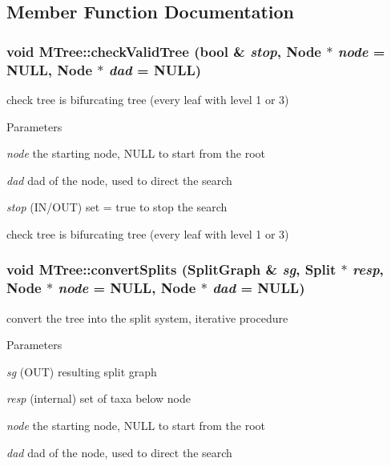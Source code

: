 \subsection{Member Function Documentation}
\hypertarget{classMTree_a4ba0e04e2f9a71b98eb2c640a1931fa7}{
\subsubsection[{checkValidTree}]{\setlength{\rightskip}{0pt plus 5cm}void MTree::checkValidTree (bool \& {\em stop}, \/  {\bf Node} $\ast$ {\em node} = {\ttfamily NULL}, \/  {\bf Node} $\ast$ {\em dad} = {\ttfamily NULL})}}
\label{classMTree_a4ba0e04e2f9a71b98eb2c640a1931fa7}
check tree is bifurcating tree (every leaf with level 1 or 3) 
\begin{DoxyParams}{Parameters}
\item[{\em node}]the starting node, NULL to start from the root \item[{\em dad}]dad of the node, used to direct the search \item[{\em stop}](IN/OUT) set = true to stop the search\end{DoxyParams}
check tree is bifurcating tree (every leaf with level 1 or 3) \hypertarget{classMTree_a4f9af679d8d53b11044343f6a394e9ab}{
\subsubsection[{convertSplits}]{\setlength{\rightskip}{0pt plus 5cm}void MTree::convertSplits ({\bf SplitGraph} \& {\em sg}, \/  {\bf Split} $\ast$ {\em resp}, \/  {\bf Node} $\ast$ {\em node} = {\ttfamily NULL}, \/  {\bf Node} $\ast$ {\em dad} = {\ttfamily NULL})}}
\label{classMTree_a4f9af679d8d53b11044343f6a394e9ab}
convert the tree into the split system, iterative procedure 
\begin{DoxyParams}{Parameters}
\item[{\em sg}](OUT) resulting split graph \item[{\em resp}](internal) set of taxa below node \item[{\em node}]the starting node, NULL to start from the root \item[{\em dad}]dad of the node, used to direct the search \end{DoxyParams}
